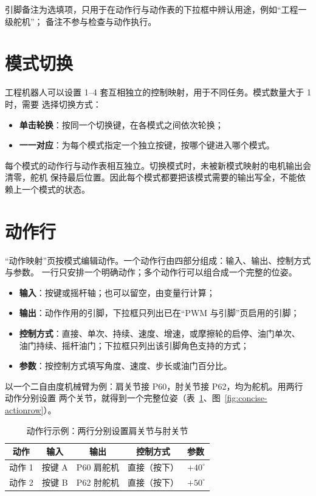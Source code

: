 引脚备注为选填项，只用于在动作行与动作表的下拉框中辨认用途，例如“工程一级舵机”；
备注不参与检查与动作执行。

\section{模式切换}

工程机器人可以设置 1--4 套互相独立的控制映射，用于不同任务。模式数量大于 1 时，需要
选择切换方式：

\begin{itemize}
  \item \textbf{单击轮换}：按同一个切换键，在各模式之间依次轮换；
  \item \textbf{一一对应}：为每个模式指定一个独立按键，按哪个键进入哪个模式。
\end{itemize}

每个模式的动作行与动作表相互独立。切换模式时，未被新模式映射的电机输出会清零，舵机
保持最后位置。因此每个模式都要把该模式需要的输出写全，不能依赖上一个模式的状态。

\section{动作行}

“动作映射”页按模式编辑动作。一个动作行由四部分组成：输入、输出、控制方式与参数。
一行只安排一个明确动作；多个动作行可以组合成一个完整的位姿。

\begin{itemize}
  \item \textbf{输入}：按键或摇杆轴；也可以留空，由变量行计算；
  \item \textbf{输出}：动作作用的引脚，下拉框只列出已在“PWM 与引脚”页启用的引脚；
  \item \textbf{控制方式}：直接、单次、持续、速度、增速，或摩擦轮的启停、油门单次、
        油门持续、摇杆油门；下拉框只列出该引脚角色支持的方式；
  \item \textbf{参数}：按控制方式填写角度、速度、步长或油门百分比。
\end{itemize}

以一个二自由度机械臂为例：肩关节接 P60，肘关节接 P62，均为舵机。用两行动作分别设置
两个关节，就得到一个完整位姿（表~\ref{tab:concise-actionrow}、图~\ref{fig:concise-actionrow}）。

\begin{table}[htbp]
  \centering
  \small
  \begin{tabularx}{\linewidth}{@{}c c c c X@{}}
    \toprule
    动作 & 输入 & 输出 & 控制方式 & 参数 \\
    \midrule
    动作 1 & 按键 A & P60 肩舵机 & 直接（按下） & $+40^\circ$ \\
    动作 2 & 按键 B & P62 肘舵机 & 直接（按下） & $+50^\circ$ \\
    \bottomrule
  \end{tabularx}
  \caption{动作行示例：两行分别设置肩关节与肘关节}
  \label{tab:concise-actionrow}
\end{table}

